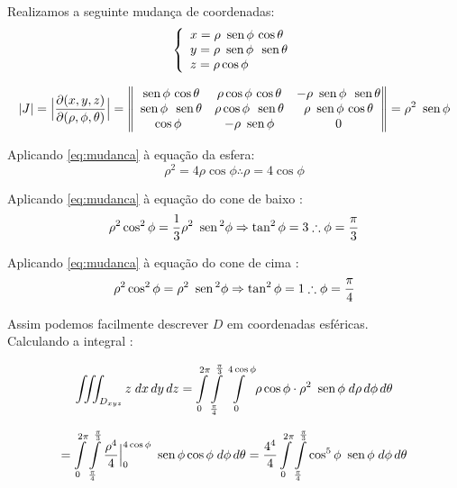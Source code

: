 \documentclass[12pt,a4paper]{article}
\newcommand{\sen}{\mbox{\, sen}\,}
\begin{document}
Realizamos a seguinte mudança de coordenadas:
\begin{equation}
\left\{\begin{array}{ll}
x=\rho\sen\phi\,\cos\theta\\
y= \rho\sen\phi\,\sen\theta\\
z = \rho\cos\phi
\end{array}\right.
\label{eq:mudanca}
\end{equation}

\begin{equation}
|J| = \Big| \frac{\partial (x,y,z) }{\partial (\rho,\phi,\theta)} \Big| = \begin{Vmatrix}
\sen\phi\,\cos\theta &  \rho\cos\phi\,\cos\theta & -\rho\sen\phi\,\sen\theta \\
\sen\phi\,\sen\theta & \rho\cos\phi\,\sen\theta & \rho\sen\phi\,\cos\theta \\
\cos\phi & -\rho\sen\phi & 0 \\
\end{Vmatrix} = \rho^2\sen\phi
\label{eq:Jac}
\end{equation}

Aplicando \eqref{eq:mudanca} \`a equaç\~{a}o da esfera:
\begin{equation}
\rho^2 = 4\rho\cos\phi \therefore \rho = 4\cos\phi
\label{eq:esfera}
\end{equation}

Aplicando \eqref{eq:mudanca} \`a equaç\~{a}o do cone de baixo :
\begin{equation}
\rho^2\cos^2\phi = \frac{1}{3} \rho^ 2 \sen^2\phi \Rightarrow \tan^2 \phi = 3 \therefore \phi = \frac{\pi}{3}
\label{eq:cone}
\end{equation}

Aplicando \eqref{eq:mudanca} \`a equaç\~{a}o do cone de cima :
\begin{equation}
\rho^2\cos^2\phi =  \rho^ 2 \sen^2\phi \Rightarrow \tan^2 \phi = 1 \therefore \phi = \frac{\pi}{4}
\label{eq:cone2}
\end{equation}


Assim podemos facilmente descrever $D$ em coordenadas esf\'{e}ricas. \\

Calculando a integral : \

$$ \iiint_{D_{xyz}}{z}\;dx\,dy\,dz  = \int\limits_{0}^{2\pi} \int\limits_{\frac{\pi}{4}}^{\frac{\pi}{3}}  \int\limits_{0}^{4\cos\phi} \rho \cos \phi \cdot \rho^2 \sen\phi \;d\rho\, d\phi\,d\theta $$

$$ = \int\limits_{0}^{2\pi} \int\limits_{\frac{\pi}{4}}^{\frac{\pi}{3}}  \frac{\rho^4}{4} \Big|_{0}^{4\cos\phi} \sen \phi \cos \phi \;d\phi\,d\theta = \frac{4^4}{4} \int\limits_{0}^{2\pi} \int\limits_{\frac{\pi}{4}}^{\frac{\pi}{3}}  \cos^5\phi \sen \phi \;d\phi\,d\theta  $$
\end{document}

